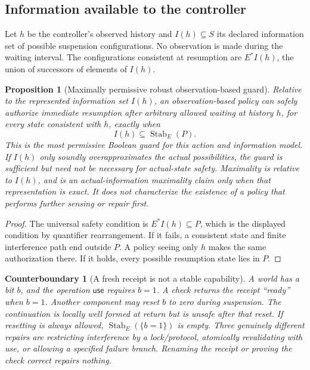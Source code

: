\documentclass[11pt]{article}
\newtheorem{proposition}[theorem]{Proposition}
\newtheorem{example}[theorem]{Counterboundary}
\newcommand{\Stab}{\operatorname{Stab}}
\begin{document}
\subsection{Information available to the controller}
Let $h$ be the controller's observed history and $I(h)\subseteq S$ its declared information set of possible suspension configurations. No observation is made during the waiting interval. The configurations consistent at resumption are $E^*I(h)$, the union of successors of elements of $I(h)$.
\begin{proposition}[Maximally permissive robust observation-based guard]\label{resumption:knowledge}
Relative to the represented information set $I(h)$, an observation-based policy can safely authorize immediate resumption after arbitrary allowed waiting at history $h$, for every state consistent with $h$, exactly when
\[
 I(h)\subseteq\Stab_E(P).
\]
This is the most permissive Boolean guard for this action and information model. If $I(h)$ only soundly overapproximates the actual possibilities, the guard is sufficient but need not be necessary for actual-state safety. Maximality is relative to $I(h)$, and is an actual-information maximality claim only when that representation is exact. It does not characterize the existence of a policy that performs further sensing or repair first.
\end{proposition}
\begin{proof}
The universal safety condition is $E^*I(h)\subseteq P$, which is the displayed condition by quantifier rearrangement. If it fails, a consistent state and finite interference path end outside $P$. A policy seeing only $h$ makes the same authorization there. If it holds, every possible resumption state lies in $P$.
\end{proof}

\begin{example}[A fresh receipt is not a stable capability]
A world has a bit $b$, and the operation $\mathsf{use}$ requires $b=1$. A check returns the receipt ``ready'' when $b=1$. Another component may reset $b$ to zero during suspension. The continuation is locally well formed at return but is unsafe after that reset. If resetting is always allowed, $\Stab_E(\{b=1\})$ is empty. Three genuinely different repairs are restricting interference by a lock/protocol, atomically revalidating with use, or allowing a specified failure branch. Renaming the receipt or proving the check correct repairs nothing.
\end{example}
\end{document}
